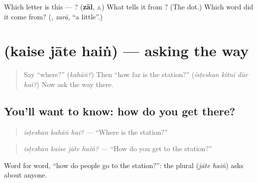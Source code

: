 \begin{tcolorbox}[breakable,colback=teal!4,colframe=teal!35!black,title={Before you move on}]
Which letter is this — ? (\textbf{zāl}, \emph{z}.) What tells it from ? (The dot.) Which word did it come from? (\textbf{}, \emph{zarā}, \textquotedblleft{}a little\textquotedblright{}.)
\end{tcolorbox}
\section[\texorpdfstring{\ur{کیسے} \ur{جاتے} \ur{ہیں} (kaise jāte haiṅ)}{کیسے جاتے ہیں (kaise jāte haiṅ)}]{   (kaise jāte haiṅ) — asking the way}

\label{lesson:UR-C270-kaise-jate-hain}



\begin{quote}
Say \textquotedblleft{}where?\textquotedblright{} (\emph{kahāṅ?}) Then \textquotedblleft{}how far is the station?\textquotedblright{} (\emph{isṭeshan kitnī dūr hai?}) Now ask the way there.
\end{quote}

\subsection*{You'll want to know: how do you get there?}
\begin{quote}
\textbf{  }
\end{quote}

\begin{quote}
\emph{isṭeshan kahāṅ hai?} — \textquotedblleft{}Where is the station?\textquotedblright{}
\end{quote}

\begin{quote}
\textbf{   }
\end{quote}

\begin{quote}
\emph{isṭeshan kaise jāte haiṅ?} — \textquotedblleft{}How do you get to the station?\textquotedblright{}
\end{quote}

Word for word, \textquotedblleft{}how do people go to the station?\textquotedblright{}: the plural \textbf{ } (\emph{jāte haiṅ}) asks about anyone.

\begin{quote}
\textbf{   }
\end{quote}

